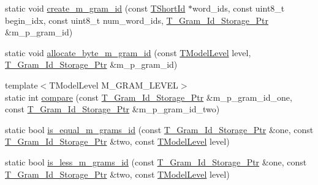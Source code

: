 \begin{DoxyCompactItemize}
\item 
static void \hyperlink{structuva_1_1smt_1_1tries_1_1mgrams_1_1_byte___m___gram___id_a68bb1896570a66eb908e06f0a12dc5a1}{create\+\_\+m\+\_\+gram\+\_\+id} (const \hyperlink{namespaceuva_1_1smt_1_1hashing_adcf22e1982ad09d3a63494c006267469}{T\+Short\+Id} $\ast$word\+\_\+ids, const uint8\+\_\+t begin\+\_\+idx, const uint8\+\_\+t num\+\_\+word\+\_\+ids, \hyperlink{namespaceuva_1_1smt_1_1tries_1_1mgrams_1_1_m___gram___id_a478e6468dbd5dab37599c566d77c845c}{T\+\_\+\+Gram\+\_\+\+Id\+\_\+\+Storage\+\_\+\+Ptr} \&m\+\_\+p\+\_\+gram\+\_\+id)
\item 
static void \hyperlink{structuva_1_1smt_1_1tries_1_1mgrams_1_1_byte___m___gram___id_ae58b2b3de2e1cdadcaf09104cc90732a}{allocate\+\_\+byte\+\_\+m\+\_\+gram\+\_\+id} (const \hyperlink{namespaceuva_1_1smt_1_1tries_a20577a44b3a42d26524250634379b7cb}{T\+Model\+Level} level, \hyperlink{namespaceuva_1_1smt_1_1tries_1_1mgrams_1_1_m___gram___id_a478e6468dbd5dab37599c566d77c845c}{T\+\_\+\+Gram\+\_\+\+Id\+\_\+\+Storage\+\_\+\+Ptr} \&m\+\_\+p\+\_\+gram\+\_\+id)
\item 
{\footnotesize template$<$T\+Model\+Level M\+\_\+\+G\+R\+A\+M\+\_\+\+L\+E\+V\+E\+L$>$ }\\static int \hyperlink{structuva_1_1smt_1_1tries_1_1mgrams_1_1_byte___m___gram___id_ac70e548e673867b53ba5f19dc5969b67}{compare} (const \hyperlink{namespaceuva_1_1smt_1_1tries_1_1mgrams_1_1_m___gram___id_a478e6468dbd5dab37599c566d77c845c}{T\+\_\+\+Gram\+\_\+\+Id\+\_\+\+Storage\+\_\+\+Ptr} \&m\+\_\+p\+\_\+gram\+\_\+id\+\_\+one, const \hyperlink{namespaceuva_1_1smt_1_1tries_1_1mgrams_1_1_m___gram___id_a478e6468dbd5dab37599c566d77c845c}{T\+\_\+\+Gram\+\_\+\+Id\+\_\+\+Storage\+\_\+\+Ptr} \&m\+\_\+p\+\_\+gram\+\_\+id\+\_\+two)
\item 
static bool \hyperlink{structuva_1_1smt_1_1tries_1_1mgrams_1_1_byte___m___gram___id_ab3631a722457d2673a8f61058f422823}{is\+\_\+equal\+\_\+m\+\_\+grams\+\_\+id} (const \hyperlink{namespaceuva_1_1smt_1_1tries_1_1mgrams_1_1_m___gram___id_a478e6468dbd5dab37599c566d77c845c}{T\+\_\+\+Gram\+\_\+\+Id\+\_\+\+Storage\+\_\+\+Ptr} \&one, const \hyperlink{namespaceuva_1_1smt_1_1tries_1_1mgrams_1_1_m___gram___id_a478e6468dbd5dab37599c566d77c845c}{T\+\_\+\+Gram\+\_\+\+Id\+\_\+\+Storage\+\_\+\+Ptr} \&two, const \hyperlink{namespaceuva_1_1smt_1_1tries_a20577a44b3a42d26524250634379b7cb}{T\+Model\+Level} level)
\item 
static bool \hyperlink{structuva_1_1smt_1_1tries_1_1mgrams_1_1_byte___m___gram___id_a51fddeb748900354d7e2175a5ae5944f}{is\+\_\+less\+\_\+m\+\_\+grams\+\_\+id} (const \hyperlink{namespaceuva_1_1smt_1_1tries_1_1mgrams_1_1_m___gram___id_a478e6468dbd5dab37599c566d77c845c}{T\+\_\+\+Gram\+\_\+\+Id\+\_\+\+Storage\+\_\+\+Ptr} \&one, const \hyperlink{namespaceuva_1_1smt_1_1tries_1_1mgrams_1_1_m___gram___id_a478e6468dbd5dab37599c566d77c845c}{T\+\_\+\+Gram\+\_\+\+Id\+\_\+\+Storage\+\_\+\+Ptr} \&two, const \hyperlink{namespaceuva_1_1smt_1_1tries_a20577a44b3a42d26524250634379b7cb}{T\+Model\+Level} level)

\end{DoxyCompactItemize}
